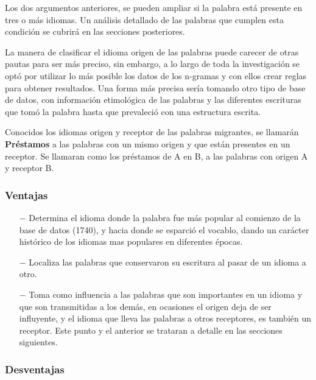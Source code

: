 Los dos argumentos anteriores, se pueden ampliar si la palabra está presente en tres o más idiomas. Un análisis detallado de las palabras que cumplen esta condición se cubrirá en las secciones posteriores.

La manera de clasificar el idioma origen de las palabras puede carecer de otras pautas para ser más preciso, sin embargo, a lo largo de toda la investigación se optó por utilizar lo más posible los datos de los n-gramas y  con ellos crear reglas para obtener resultados.  Una forma más precisa sería tomando otro tipo de base de datos, con información etimológica de las palabras y las diferentes escrituras que tomó la palabra hasta que prevaleció con una estructura escrita.  

Conocidos los idiomas origen y receptor de las palabras migrantes, se llamarán \textbf{Préstamos} a las palabras con un mismo origen y que están  presentes en un receptor.  Se llamaran como los préstamos de A en B, a las palabras con origen A y receptor B. 


\subsubsection*{Ventajas}


\begin{itemize}
	
	\item [$-$] Determina el idioma donde la palabra fue más popular al comienzo de la base de datos (1740), y hacia donde se esparció el vocablo, dando un carácter histórico de los idiomas mas populares en diferentes épocas. 
	
	\item [$-$] Localiza las palabras que conservaron su escritura al pasar de un idioma a otro. 
	
	\item [$-$] Toma como influencia a las palabras que son importantes en un idioma y que son transmitidas a los demás, en ocasiones el origen deja de ser influyente, y el idioma que lleva las palabras a otros receptores, es también un receptor.  Este punto y el anterior se trataran a detalle en las secciones siguientes. 
	
\end{itemize}


\subsubsection*{Desventajas}


